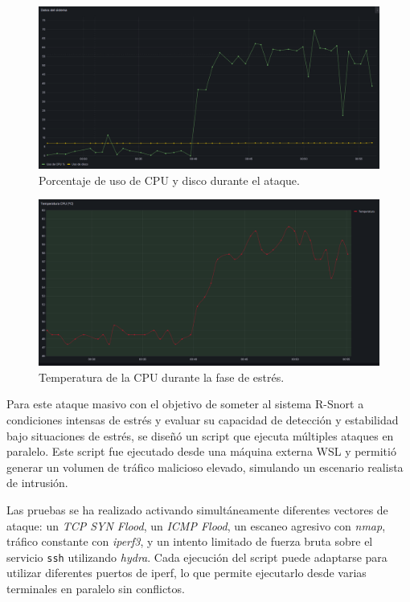 \documentclass[11pt,a4paper,twoside]{report}
\begin{document}
\begin{figure}[H]
	\centering
	\includegraphics[width=\textwidth]{benchmark/5.png}
	\caption{Porcentaje de uso de CPU y disco durante el ataque.}
	\label{fig:bench-uso-cpu-disco}
\end{figure}

\begin{figure}[H]
	\centering
	\includegraphics[width=\textwidth]{benchmark/4.png}
	\caption{Temperatura de la CPU durante la fase de estrés.}
	\label{fig:bench-temp-cpu}
\end{figure}

Para este ataque masivo con el objetivo de someter al sistema R-Snort a condiciones intensas de estrés y evaluar su capacidad de detección y estabilidad bajo situaciones de estrés, se diseñó un script que ejecuta múltiples ataques en paralelo. Este script fue ejecutado desde una máquina externa WSL y permitió generar un volumen de tráfico malicioso elevado, simulando un escenario realista de intrusión.\newline

Las pruebas se ha realizado activando simultáneamente diferentes vectores de ataque: un \textit{TCP SYN Flood}, un \textit{ICMP Flood}, un escaneo agresivo con \textit{nmap}, tráfico constante con \textit{iperf3}, y un intento limitado de fuerza bruta sobre el servicio \texttt{ssh} utilizando \textit{hydra}. Cada ejecución del script puede adaptarse para utilizar diferentes puertos de iperf, lo que permite ejecutarlo desde varias terminales en paralelo sin conflictos.\newline
\end{document}

